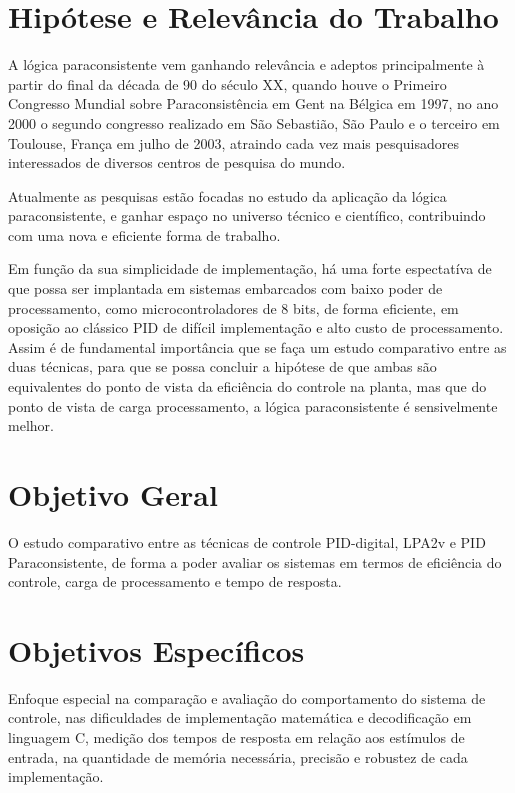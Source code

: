 \documentclass[12pt,a4paper]{report}
\begin{document}
\section{Hipótese e Relevância do Trabalho}
A lógica paraconsistente vem ganhando relevância e adeptos principalmente à partir do final da década de 90 do século XX, quando houve o Primeiro Congresso Mundial sobre Paraconsistência em Gent na Bélgica em 1997, no ano 2000 o segundo congresso realizado em São Sebastião, São Paulo e o terceiro em Toulouse, França em julho de 2003, atraindo cada vez mais pesquisadores interessados de diversos centros de pesquisa do mundo.  \cite{DecioKrause}

Atualmente as pesquisas estão focadas no estudo da aplicação da lógica paraconsistente, e ganhar espaço no universo técnico e científico, contribuindo com uma nova e eficiente forma de trabalho.

Em função da sua simplicidade de implementação, há uma forte espectatíva de que possa ser implantada em sistemas embarcados com baixo poder de processamento, como microcontroladores de 8 bits, de forma eficiente, em oposição ao clássico PID de difícil implementação e alto custo de processamento. Assim é de fundamental importância que se faça um estudo comparativo entre as duas técnicas, para que se possa concluir a hipótese de que ambas são equivalentes do ponto de vista da eficiência do controle na planta, mas que do ponto de vista de carga processamento, a lógica paraconsistente é sensivelmente melhor.


\section{Objetivo Geral}
O estudo comparativo entre as técnicas de controle PID-digital, LPA2v e PID Paraconsistente, de forma a poder avaliar os sistemas em termos de eficiência do controle, carga de processamento e tempo de resposta.


\section{Objetivos Específicos}
Enfoque especial na comparação e avaliação do comportamento do sistema de controle, nas dificuldades de implementação matemática e decodificação em linguagem C, medição dos tempos de resposta em relação aos estímulos de entrada, na quantidade de memória necessária, precisão e robustez de cada implementação.
\end{document}
